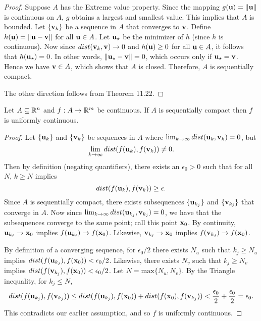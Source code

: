 \documentclass[letterpaper, twoside, 12pt]{book}
\begin{document}
\begin{proof}
    Suppose \(A\) has the Extreme value property. Since the mapping
    \(g(\mathbf u) = \|\mathbf u\|\) is continuous on \(A\), \(g\)
    obtains a largest and smallest value. This implies that \(A\)
    is bounded. Let \(\{\mathbf v_k\}\) be a sequence in \(A\)
    that converges to \(\mathbf v\). Define \(h(\mathbf u) = \|\mathbf u - \mathbf v\|\)
    for all \(\mathbf u \in A\). Let \(\mathbf u_{\star}\) be the
    minimizer of \(h\) (since \(h\) is continuous). Now since
    \(dist(\mathbf v_k, \mathbf v) \to 0\) and \(h(\mathbf u) \geq 0\)
    for all \(\mathbf u \in A\), it follows that \(h(\mathbf u_{\star}) = 0\).
    In other words, \(\|\mathbf u_{\star} - \mathbf v\| = 0\), which 
    occurs only if \(\mathbf u_{\star} = \mathbf v\). Hence we have
    \(\mathbf v \in A\), which shows that \(A\) is closed. Therefore,
    \(A\) is sequentially compact.

    The other direction follows from Theorem 11.22.
\end{proof}

\begin{theorem}[11.25, Exercise 5]
  Let \(A\subseteq\mathbb R^n\) and \(f:A\to\mathbb R^m\) be continuous.
  If \(A\) is sequentially compact then \(f\) is uniformly continuous.
\end{theorem}

\begin{proof}
    Let \(\{\mathbf u_k\}\) and \(\{\mathbf v_k\}\) be sequences in \(A\)
    where \(\lim_{k \to \infty} dist(\mathbf u_k, \mathbf v_k) = 0\), but
    \[ \lim_{k \to \infty} dist(f(\mathbf u_k), f(\mathbf v_k)) \neq 0 .\] 
    Then by definition (negating quantifiers), there exists an 
    \(\epsilon_0 > 0\) such that for all \(N\), \(k \geq N\) implies
    \[ dist(f(\mathbf u_k), f(\mathbf v_k)) \geq \epsilon .\]
    Since \(A\) is sequentially compact, there exists subsequences
    \(\{\mathbf u_{k_j}\}\) and \(\{\mathbf v_{k_j}\}\) that converge
    in \(A\). Now since \(\lim_{k \to \infty} dist(\mathbf u_{k_j}, \mathbf v_{k_j}) = 0\),
    we have that the subsequences converge to the same point; 
    call this point \(\mathbf x_0\). By continuity, \(\mathbf u_{k_j} \to \mathbf x_0\)
    implies \(f(\mathbf u_{k_j}) \to f(\mathbf x_0)\). Likewise,
    \(\mathbf v_{k_j} \to \mathbf x_0\) implies \(f(\mathbf v_{k_j}) \to f(\mathbf x_0)\).

    By definition of a converging sequence, for \(\epsilon_0 / 2\)
    there exists \(N_u\) such that \(k_j \geq N_u\) implies
    \(dist(f(\mathbf u_{k_j}),  f(\mathbf x_0)) < \epsilon_0 / 2\).
    Likewise, there exists \(N_v\) such that \(k_j \geq N_v\) implies
    \(dist(f(\mathbf v_{k_j}), f(\mathbf x_0)) < \epsilon_0 / 2\). 
    Let \(N = \text{max}\{N_u, N_v\}\). By the Triangle inequality, for \(k_j \leq N\),
    \[ dist(f(\mathbf u_{k_j}), f(\mathbf v_{k_j})) \leq
    dist(f(\mathbf u_{k_j}), f(\mathbf x_0)) + dist(f(\mathbf x_0), f(\mathbf v_{k_j})) < 
    \frac{\epsilon_0}{2} + \frac{\epsilon_0}{2} = \epsilon_0 .\]
    This contradicts our earlier assumption, and so \(f\) is uniformly
    continuous.
\end{proof}
\end{document}
